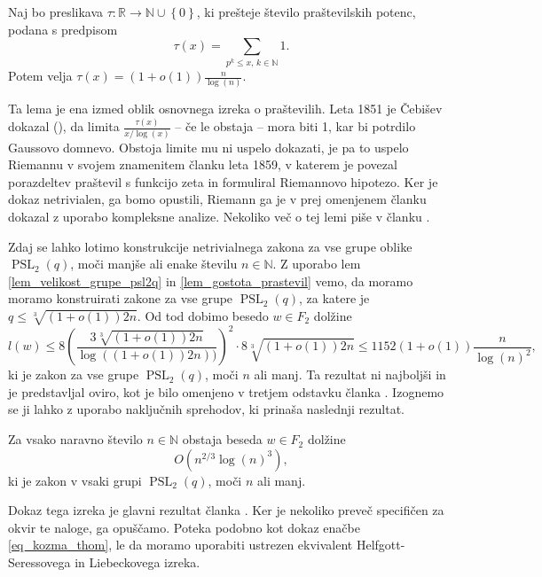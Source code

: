     \begin{lema}
    \label{lem_gostota_prastevil}
    Naj bo preslikava $\tau : \mathbb{R} \to \mathbb{N} \cup \left\{ 0\right\}$, ki prešteje število praštevilskih potenc, podana s predpisom \begin{equation*}
    \tau(x) = \sum_{p^{k} \le x, \, k \in \mathbb{N}} 1.
    \end{equation*}  
     Potem velja $\tau(x) = (1 + o(1)) \frac{n}{\log(n)}$.     
    \end{lema}
    Ta lema je ena izmed oblik osnovnega izreka o praštevilih. Leta     1851 je Čebišev dokazal (\cite[str.~4--5]{Granville_1993}), da limita $\frac{\tau(x)}{x / \log(x)}$ -- če le obstaja -- mora biti 1, kar bi potrdilo Gaussovo domnevo. Obstoja limite mu ni uspelo dokazati, je pa to uspelo Riemannu v svojem znamenitem članku \cite{Riemann_1859} leta 1859, v katerem je povezal porazdeltev praštevil s funkcijo zeta in formuliral Riemannovo hipotezo.
    Ker je dokaz netrivialen, ga bomo opustili, Riemann ga je v prej omenjenem članku dokazal z uporabo kompleksne analize. 
    Nekoliko več o tej lemi piše v članku \cite{Kozma_Thom_2016}.            
   
    Zdaj se lahko lotimo konstrukcije netrivialnega zakona za vse grupe oblike $\operatorname{PSL}_2(q)$, moči manjše ali enake številu $n \in \mathbb{N}$. Z uporabo lem \ref{lem_velikost_grupe_psl2q} in \ref{lem_gostota_prastevil}
    vemo, da moramo moramo konstruirati zakone za vse grupe $\operatorname{PSL}_2(q)$, za katere je $q \le \sqrt[3]{(1 + o(1)) 2n}$. Od tod dobimo besedo $w \in F_2$ dolžine \begin{equation*}
    l(w) \le 8 \left( \frac{3 \sqrt[3]{(1 + o(1)) 2n}}{\log((1 + o(1)) 2n))}  \right)^2 \cdot 8 \sqrt[3]{(1 + o(1)) 2n} \le 1152 (1 + o(1)) \frac{n}{\log(n)^2},
    \end{equation*}  
    ki je zakon za vse grupe $\operatorname{PSL}_2(q)$, moči $n$ ali manj. Ta rezultat ni najboljši in je predstavljal oviro, kot je bilo omenjeno v tretjem odstavku članka \cite[str.~6]{Bradford_Thom_2017}.
    Izognemo se ji lahko z uporabo naključnih sprehodov, ki prinaša naslednji rezultat.

    \begin{izrek}
    \label{izr_bradford_thom}
    Za vsako naravno število $n \in \mathbb{N}$ obstaja beseda $w \in F_2$ dolžine \begin{equation*}
        O( n^{2 / 3} {\log(n)}^3),
        \end{equation*}  
        ki je zakon v vsaki grupi $\operatorname{PSL}_2(q)$, moči $n$ ali manj.
    \end{izrek}
    Dokaz tega izreka je glavni rezultat članka \cite{Bradford_Thom_2017}. Ker je nekoliko preveč specifičen za okvir te naloge, ga opuščamo.
    Poteka podobno kot dokaz enačbe \ref{eq_kozma_thom}, le da moramo uporabiti ustrezen ekvivalent Helfgott-Seressovega in Liebeckovega izreka. 

